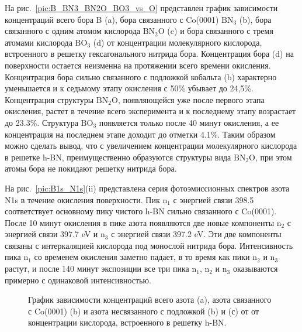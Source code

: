 На рис.~\ref{pic:B_BN3_BN2O_BO3_vs_O} представлен график зависимости концентраций всего бора B (a), бора связанного с Co(0001)
$\mathrm{BN_3}$ (b), бора связанного с одним атомом кислорода $\mathrm{BN_2O}$ (c) и бора связанного с тремя атомами кислорода
$\mathrm{BO_3}$ (d) от концентрации молекулярного кислорода, встроенного в решетку гексагонального нитрида бора. Концентрация бора (d) на поверхности
остается неизменна на протяжении всего времени окисления. Концентрация бора сильно связанного с подложкой кобальта (b) характерно 
уменьшается и к седьмому этапу окисления с 50\% убывает до 24,5\%. Концентрация структуры $\mathrm{BN_2O}$, появляющейся уже после
первого этапа окисления, растет в течение всего эксперимента и к последнему этапу возрастает до 23.3\%. Структура $\mathrm{BO_3}$
появляется только после 40 минут окисления, а ее концентрация на последнем этапе доходит до отметки 4.1\%. Таким образом можно
сделать вывод, что с увеличением концентрации молекулярного кислорода в решетке h-BN, преимущественно образуются структуры вида
$\mathrm{BN_2O}$, при этом атомы бора не покидают решетку нитрида бора.


На рис.~\ref{pic:B1s_N1s}(ii) представлена серия фотоэмиссионных спектров азота N1s в течение окисления поверхности.
Пик $\mathrm{n_1}$ с энергией связи 398.5 соответствует основному пику чистого h-BN сильно связанного с Co(0001).
После 10 минут окисления в пике азота появляются две новые компоненты $\mathrm{n_2}$ с энергией связи 397.7 eV и
$\mathrm{n_3}$ с энергией связи 397.2 eV. Эти две компоненты связаны с интеркаляцией кислорода под монослой нитрида бора.
Интенсивность пика $\mathrm{n_1}$ со временем окисления заметно падает, в то время как пики $\mathrm{n_2}$ и $\mathrm{n_3}$
растут, и после 140 минут экспозиции все три пика $\mathrm{n_1}$, $\mathrm{n_2}$ и $\mathrm{n_3}$ оказываются примерно с
одинаковой интенсивностью. %
\begin{figure}[!ht]
\caption{График зависимости концентраций всего азота (a), азота связанного с Co(0001) (b) и азота несвязанного с подложкой (b) и (с) от от концентрации кислорода, встроенного в решетку h-BN.}
\label{pic:Nfree_Nco_Ntot_vs_O}
\end{figure}


